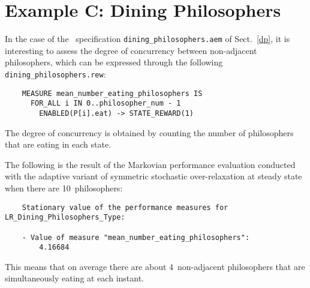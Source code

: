 \section{Example C: Dining Philosophers}

In the case of the \aemilia\ specification {\tt dining\_philosophers.aem} of Sect.~\ref{dp}, it is
interesting to assess the degree of concurrency between non-adjacent philosophers, which can be expressed
through the following {\tt dining\_philosophers.rew}:

        \begin{verbatim}
    MEASURE mean_number_eating_philosophers IS
      FOR_ALL i IN 0..philosopher_num - 1
        ENABLED(P[i].eat) -> STATE_REWARD(1)
        \end{verbatim}

\noindent The degree of concurrency is obtained by counting the number of philosophers that are eating in
each state.

The following is the result of the Markovian performance evaluation conducted with the adaptive variant of
symmetric stochastic over-relaxation at steady state when there are 10~philosophers:

        \begin{verbatim}
    Stationary value of the performance measures for LR_Dining_Philosophers_Type:

    - Value of measure "mean_number_eating_philosophers":
        4.16684
        \end{verbatim}

\noindent This means that on average there are about 4~non-adjacent philosophers that are simultaneously
eating at each instant.
